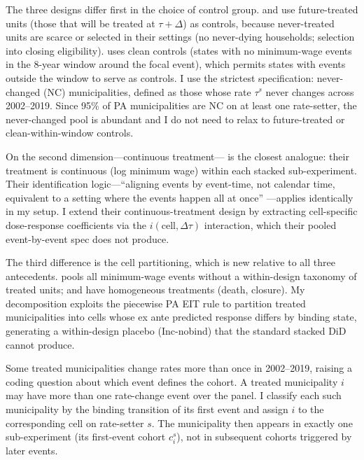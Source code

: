 \documentclass[12pt]{article}
\begin{document}
The three designs differ first in the choice of control group. \citet{fadlonFamilyLaborSupply2021a} and
\citet{deshpandeWhoScreenedOut2019a} use future-treated units (those that
will be treated at $\tau + \Delta$) as controls, because never-treated
units are scarce or selected in their settings (no never-dying
households; selection into closing eligibility). \citet{cengizEffectMinimumWages2019a}
uses clean controls (states with no minimum-wage events in the
8-year window around the focal event), which permits states with
events outside the window to serve as controls. I use the strictest
specification: never-changed (NC) municipalities, defined as those
whose rate $\tau^s$ never changes across 2002--2019. Since 95\% of PA
municipalities are NC on at least one rate-setter, the never-changed pool is
abundant and I do not need to relax to future-treated or
clean-within-window controls.

On the second dimension---continuous treatment---\citet{cengizEffectMinimumWages2019a} is the closest
analogue: their treatment is continuous
(log minimum wage) within each stacked sub-experiment. Their
identification logic---``aligning events by event-time, not calendar
time, equivalent to a setting where the events happen all at once''
\citep[Online Appendix C]{cengizEffectMinimumWages2019a}---applies identically in my
setup. I extend their continuous-treatment design by extracting
cell-specific dose-response coefficients via the
$i(\text{cell}, \Delta\tau)$ interaction, which their pooled
event-by-event spec does not produce.

The third difference is the cell partitioning, which is
new relative to all three antecedents. \citet{cengizEffectMinimumWages2019a} pools all minimum-wage
events without a within-design taxonomy of treated units;
\citet{fadlonFamilyLaborSupply2021b} and \citet{deshpandeWhoScreenedOut2019a} have homogeneous
treatments (death, closure). My decomposition exploits the piecewise
PA EIT rule to partition treated municipalities into cells whose ex ante
predicted response differs by binding state, generating a
within-design placebo (Inc-nobind) that the standard stacked DiD
cannot produce.

Some treated municipalities change rates more than once in 2002--2019, raising a coding question about which event defines the cohort.
A treated municipality $i$ may have more than one rate-change event over
the panel. I classify each such municipality by the binding transition
of its first event and assign $i$ to the corresponding cell on
rate-setter $s$. The municipality then appears in exactly one sub-experiment
(its first-event cohort $c^s_i$), not in subsequent cohorts triggered
by later events.
\end{document}
